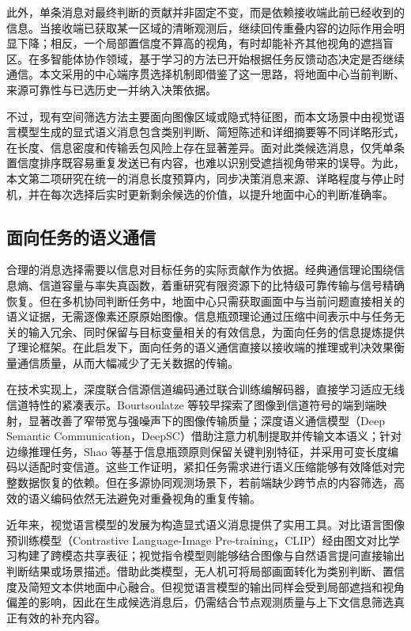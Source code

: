 此外，单条消息对最终判断的贡献并非固定不变，而是依赖接收端此前已经收到的信息。当接收端已获取某一区域的清晰观测后，继续回传重叠内容的边际作用会明显下降；相反，一个局部置信度不算高的视角，有时却能补齐其他视角的遮挡盲区。在多智能体协作领域，基于学习的方法已开始根据任务反馈动态决定是否继续通信\cite{ic3net,schednet}。本文采用的中心端序贯选择机制即借鉴了这一思路，将地面中心当前判断、来源可靠性与已选历史一并纳入决策依据。

不过，现有空间筛选方法主要面向图像区域或隐式特征图，而本文场景中由视觉语言模型生成的显式语义消息包含类别判断、简短陈述和详细摘要等不同详略形式，在长度、信息密度和传输丢包风险上存在显著差异。面对此类候选消息，仅凭单条置信度排序既容易重复发送已有内容，也难以识别受遮挡视角带来的误导。为此，本文第二项研究在统一的消息长度预算内，同步决策消息来源、详略程度与停止时机，并在每次选择后实时更新剩余候选的价值，以提升地面中心的判断准确率。

\subsection{面向任务的语义通信}

合理的消息选择需要以信息对目标任务的实际贡献作为依据。经典通信理论围绕信息熵、信道容量与率失真函数，着重研究有限资源下的比特级可靠传输与信号精确恢复\cite{shannon1948,cover2006information}。但在多机协同判断任务中，地面中心只需获取画面中与当前问题直接相关的语义证据，无需逐像素还原原始图像。信息瓶颈理论通过压缩中间表示中与任务无关的输入冗余、同时保留与目标变量相关的有效信息，为面向任务的信息提炼提供了理论框架\cite{tishby2000ib}。在此启发下，面向任务的语义通信直接以接收端的推理或判决效果衡量通信质量，从而大幅减少了无关数据的传输\cite{semantic-communications-jsac,zhou2024goal}。

在技术实现上，深度联合信源信道编码通过联合训练编解码器，直接学习适应无线信道特性的紧凑表示。Bourtsoulatze 等较早探索了图像到信道符号的端到端映射，显著改善了窄带宽与强噪声下的图像传输质量\cite{bourtsoulatze2019deepjscc}；深度语义通信模型（Deep Semantic Communication，DeepSC）借助注意力机制提取并传输文本语义\cite{xie2021deepsc,vaswani2017attention}；针对边缘推理任务，Shao 等基于信息瓶颈原则保留关键判别特征，并采用可变长度编码以适配时变信道\cite{shao2021task}。这些工作证明，紧扣任务需求进行语义压缩能够有效降低对完整数据恢复的依赖。但在多源协同观测场景下，若前端缺少跨节点的内容筛选，高效的语义编码依然无法避免对重叠视角的重复传输。

近年来，视觉语言模型的发展为构造显式语义消息提供了实用工具。对比语言图像预训练模型（Contrastive Language-Image Pre-training，CLIP）经由图文对比学习构建了跨模态共享表征\cite{clip}；视觉指令模型则能够结合图像与自然语言提问直接输出判断结果或场景描述\cite{blip2,llava}。借助此类模型，无人机可将局部画面转化为类别判断、置信度及简短文本供地面中心融合。但视觉语言模型的输出同样会受到局部遮挡和视角偏差的影响，因此在生成候选消息后，仍需结合节点观测质量与上下文信息筛选真正有效的补充内容。

